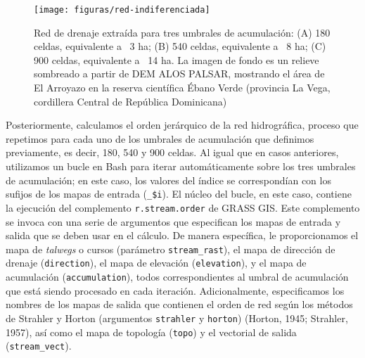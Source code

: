 \documentclass[spanish]{article}
\begin{document}
\begin{figure}

{\centering \texttt{[image: figuras/red-indiferenciada]} 

}

\caption{Red de drenaje extraída para tres umbrales de acumulación: (A) 180 celdas, equivalente a ~3 ha; (B) 540 celdas, equivalente a ~8 ha; (C) 900 celdas, equivalente a ~14 ha. La imagen de fondo es un relieve sombreado a partir de DEM ALOS PALSAR, mostrando el área de El Arroyazo en la reserva científica Ébano Verde (provincia La Vega, cordillera Central de República Dominicana)}\label{fig:redindiferenciada}
\end{figure}

Posteriormente, calculamos el orden jerárquico de la red hidrográfica,
proceso que repetimos para cada uno de los umbrales de acumulación que
definimos previamente, es decir, 180, 540 y 900 celdas. Al igual que en
casos anteriores, utilizamos un bucle en Bash para iterar
automáticamente sobre los tres umbrales de acumulación; en este caso,
los valores del índice se correspondían con los sufijos de los mapas de
entrada (\texttt{\_\$i}). El núcleo del bucle, en este caso, contiene la
ejecución del complemento \texttt{r.stream.order} de GRASS GIS. Este
complemento se invoca con una serie de argumentos que especifican los
mapas de entrada y salida que se deben usar en el cálculo. De manera
específica, le proporcionamos el mapa de \emph{talwegs} o cursos
(parámetro \texttt{stream\_rast}), el mapa de dirección de drenaje
(\texttt{direction}), el mapa de elevación (\texttt{elevation}), y el
mapa de acumulación (\texttt{accumulation}), todos correspondientes al
umbral de acumulación que está siendo procesado en cada iteración.
Adicionalmente, especificamos los nombres de los mapas de salida que
contienen el orden de red según los métodos de Strahler y Horton
(argumentos \texttt{strahler} y \texttt{horton}) (Horton, 1945;
Strahler, 1957), así como el mapa de topología (\texttt{topo}) y el
vectorial de salida (\texttt{stream\_vect}).
\end{document}
